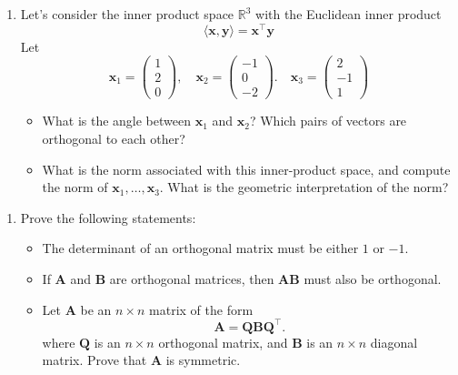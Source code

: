 \documentclass[]{book}
\providecommand{\tightlist}{%
  \setlength{\itemsep}{0pt}\setlength{\parskip}{0pt}}
\theoremstyle{definition}
\theoremstyle{definition}
\theoremstyle{definition}
\theoremstyle{remark}
\begin{document}
\begin{enumerate}
\def\labelenumi{\arabic{enumi}.}
\setcounter{enumi}{2}
\item
  Let's consider the inner product space \(\mathbb{R}^3\) with the Euclidean inner product
  \[\langle \mathbf x, \mathbf y\rangle = \mathbf x^\top \mathbf y\]
  Let
  \[\mathbf x_1 = \left(\begin{array}{c}1\\2\\0\end{array}\right), \quad \mathbf x_2 = \left(\begin{array}{c}-1\\0\\-2\end{array}\right). \quad \mathbf x_3 = \left(\begin{array}{c}2\\-1\\1\end{array}\right)
    \]

  \begin{itemize}
  \tightlist
  \item
    What is the angle between \(\mathbf x_1\) and \(\mathbf x_2\)? Which pairs of vectors are orthogonal to each other?
  \item
    What is the norm associated with this inner-product space, and compute the norm of \(\mathbf x_1, \ldots, \mathbf x_3\). What is the geometric interpretation of the norm?
  \end{itemize}
\end{enumerate}

\begin{enumerate}
\def\labelenumi{\arabic{enumi}.}
\setcounter{enumi}{3}
\tightlist
\item
  Prove the following statements:

  \begin{itemize}
  \tightlist
  \item
    The determinant of an orthogonal matrix must be either \(1\) or \(-1\).
  \item
    If \(\mathbf A\) and \(\mathbf B\) are orthogonal matrices, then \(\mathbf A\mathbf B\) must also be orthogonal.
  \item
    Let \(\mathbf A\) be an \(n\times n\) matrix of the form
    \[\mathbf A= \mathbf Q\mathbf B\mathbf Q^\top.\]
    where \(\mathbf Q\) is an \(n\times n\) orthogonal matrix, and \(\mathbf B\) is an \(n\times n\) diagonal matrix. Prove that \(\mathbf A\) is symmetric.
  \end{itemize}
\end{enumerate}
\end{document}
